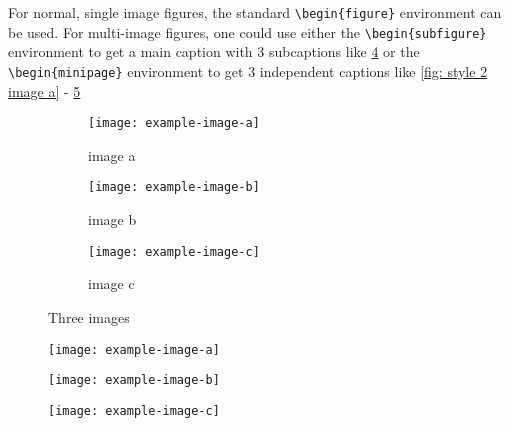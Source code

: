 For normal, single image figures, the standard \texttt{\textbackslash begin\{figure\}} environment can be used. For multi-image figures, one could use either the \texttt{\textbackslash begin\{subfigure\}} environment to get a main caption with 3 subcaptions like \cref{fig: three images} or the \texttt{\textbackslash begin\{minipage\}} environment to get 3 independent captions like \cref{fig: style 2 image a} - \ref{fig: style 2 image c}

\begin{figure}[H]
     \centering
     \begin{subfigure}[b]{0.3\textwidth}
         \centering
         \texttt{[image: example-image-a]}
         \caption{image a}
         \label{fig: style 1 image a}
     \end{subfigure}
     \hfill
     \begin{subfigure}[b]{0.3\textwidth}
         \centering
         \texttt{[image: example-image-b]}
         \caption{image b}
         \label{fig: style 1 image b}
     \end{subfigure}
     \hfill
     \begin{subfigure}[b]{0.3\textwidth}
         \centering
         \texttt{[image: example-image-c]}
         \caption{image c}
         \label{fig: style 1 image c}
     \end{subfigure}
        \caption{Three images}
        \label{fig: three images}
\end{figure}

\begin{figure}[H]
\centering
\begin{minipage}{0.3\textwidth}
  \centering
  \texttt{[image: example-image-a]}
  \label{fig: style 2 image a}
\end{minipage}
\hfill
\begin{minipage}{0.3\textwidth}
  \centering
  \texttt{[image: example-image-b]}
  \label{fig: style 2 image b}
\end{minipage}
\hfill
\begin{minipage}{0.3\textwidth}
  \centering
  \texttt{[image: example-image-c]}
  \label{fig: style 2 image c}
\end{minipage}
\end{figure}